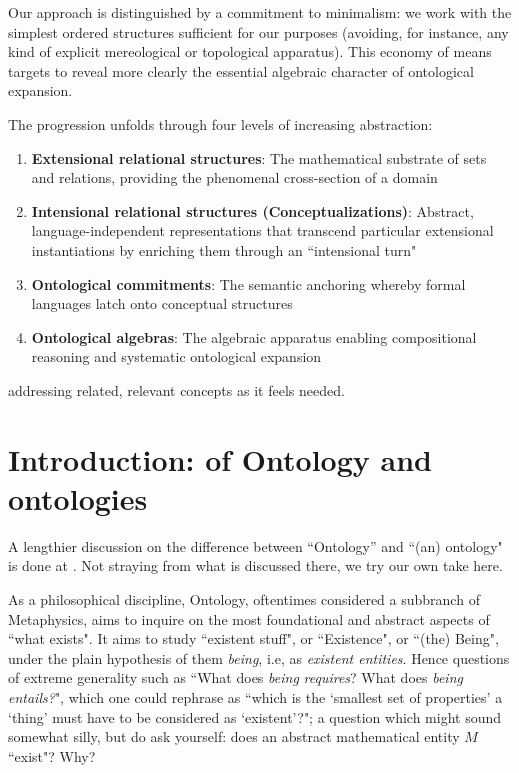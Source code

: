 \documentclass[11pt,a4paper]{article}
\begin{document}
Our approach is distinguished by a commitment to minimalism: we work with the simplest ordered structures sufficient for our purposes (avoiding, for instance, any kind of explicit mereological or topological apparatus). This economy of means targets to reveal more clearly the essential algebraic character of ontological expansion.

The progression unfolds through four levels of increasing abstraction:
\begin{enumerate}[label=(\roman*)]
    \item \textbf{Extensional relational structures}: The mathematical substrate of sets and relations, providing the phenomenal cross-section of a domain
    \item \textbf{Intensional relational structures (Conceptualizations)}: Abstract, language-independent representations that transcend particular extensional instantiations by enriching them through an ``intensional turn"
    \item \textbf{Ontological commitments}: The semantic anchoring whereby formal languages latch onto conceptual structures
    \item \textbf{Ontological algebras}: The algebraic apparatus enabling compositional reasoning and systematic ontological expansion
\end{enumerate}

addressing related, relevant concepts as it feels needed.

\section{Introduction: of Ontology and ontologies}

A lengthier discussion on the difference between ``Ontology'' and ``(an) ontology" is done at \citet{guarino2009}. Not straying from what is discussed there, we try our own take here.

As a philosophical discipline, Ontology, oftentimes considered a subbranch of Metaphysics, aims to inquire on the most foundational and abstract aspects of ``what exists". It aims to study ``existent stuff", or ``Existence", or ``(the) Being", under the plain hypothesis of them \textit{being}, i.e, as \textit{existent entities}. Hence questions of extreme generality such as ``What does \textit{being} \textit{requires}? What does \textit{being} \textit{entails?}", which one could rephrase as ``which is the `smallest set of properties' a `thing' must have to be considered as `existent'?"; a question which might sound somewhat silly, but do ask yourself: does an abstract mathematical entity $M$ ``exist"? Why? 
\end{document}
